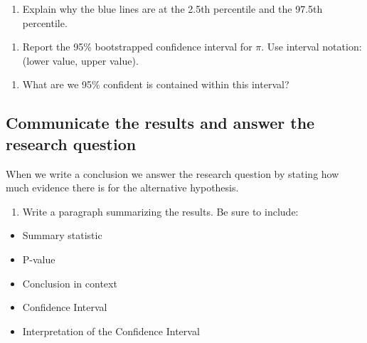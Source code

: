 \documentclass[
]{report}
\providecommand{\tightlist}{%
  \setlength{\itemsep}{0pt}\setlength{\parskip}{0pt}}
\begin{document}
\begin{enumerate}
\def\labelenumi{\arabic{enumi}.}
\setcounter{enumi}{24}
\tightlist
\item
  Explain why the blue lines are at the 2.5th percentile and the 97.5th percentile.
\end{enumerate}

\vspace{1in}

\begin{enumerate}
\def\labelenumi{\arabic{enumi}.}
\setcounter{enumi}{25}
\tightlist
\item
  Report the 95\% bootstrapped confidence interval for \(\pi\). Use interval notation: (lower value, upper value).
\end{enumerate}

\vspace{1in}

\begin{enumerate}
\def\labelenumi{\arabic{enumi}.}
\setcounter{enumi}{26}
\tightlist
\item
  What are we 95\% confident is contained within this interval?
\end{enumerate}

\vspace{1in}

\hypertarget{communicate-the-results-and-answer-the-research-question}{%
\subsection{Communicate the results and answer the research question}\label{communicate-the-results-and-answer-the-research-question}}

When we write a conclusion we answer the research question by stating how much evidence there is for the alternative hypothesis.

\begin{enumerate}
\def\labelenumi{\arabic{enumi}.}
\setcounter{enumi}{27}
\tightlist
\item
  Write a paragraph summarizing the results. Be sure to include:
\end{enumerate}

\begin{itemize}
\item
  Summary statistic
\item
  P-value
\item
  Conclusion in context
\item
  Confidence Interval
\item
  Interpretation of the Confidence Interval
\end{itemize}
\end{document}
